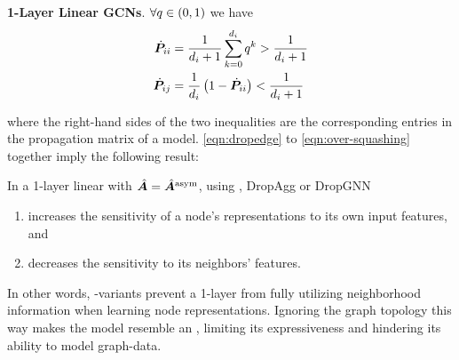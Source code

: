 
\textbf{1-Layer Linear GCNs}. $\forall q\in\left(0,1\right)$ we have
\begin{alignat}{3}
\begin{split}
    \dot{\bm{P}}_{ii} &= \frac{1}{d_i+1} \sum_{k=0}^{d_i} q^k > \frac{1}{d_i+1} \\
    \dot{\bm{P}}_{ij} &= \frac{1}{d_i}\left(1-\dot{\bm{P}}_{ii}\right) < \frac{1}{d_i+1}
\end{split} \label{eqn:over-squashing}
\end{alignat}

where the right-hand sides of the two inequalities are the corresponding entries in the propagation matrix of a  model. %
\autoref{eqn:dropedge} to \autoref{eqn:over-squashing} together imply the following result:

\begin{lemma} %
\label{thm:sensitivity-1-layer}
    In a 1-layer linear  with $\hat{\bm{A}} = \hat{\bm{A}}^{\text{asym}}$, using , DropAgg or DropGNN
    \begin{enumerate}
        \item increases the sensitivity of a node's representations to its own input features, and
        \item decreases the sensitivity to its neighbors' features.
    \end{enumerate}
\end{lemma}

In other words, -variants prevent a 1-layer  from fully utilizing neighborhood information when learning node representations. Ignoring the graph topology this way makes the model resemble an , limiting its expressiveness and hindering its ability to model graph-data.

